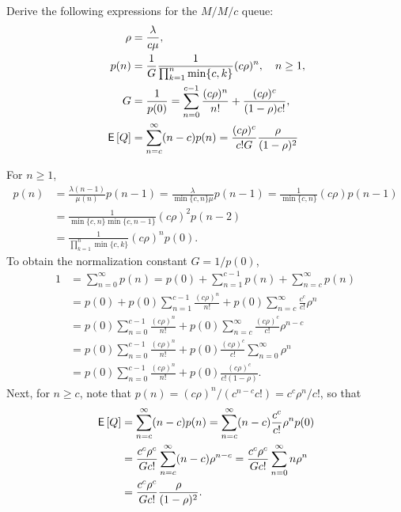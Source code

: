 \documentclass[stochastic-or.tex]{subfiles}
\begin{document}
\begin{extra}\label{ex:7}
Derive the following expressions for the  $M/M/c$ queue:
\begin{subequations}
\begin{align}
  \rho & = \frac{\lambda}{ c\mu},\\
p(n) &= \frac 1 {G} \frac{1}{\prod_{k=1}^{n}\min\{c, k\}}(c\rho)^{n} , \quad n\geq 1,\\
G &= \frac 1{p(0)} = \sum_{n=0}^{c-1} \frac{(c\rho)^n}{n!} + \frac{(c\rho)^c}{(1-\rho)c!}, \label{eq:501}\\
\,\mathsf{E}\left[Q\right] &= \sum_{n=c}^\infty (n-c) p(n) = \frac{(c\rho)^c}{c! G}\frac{\rho}{(1-\rho)^2}\\
\end{align}
\end{subequations}
\begin{solution}
  For $n\geq 1$,
 \begin{align*}
 p(n)
 &= \frac{\lambda(n-1)}{\mu(n)}p(n-1)
 = \frac{\lambda}{\min\{c, n\} \mu }p(n-1)
 = \frac{1}{\min\{c, n\}}(c\rho) p(n-1) \\
 & = \frac{1}{\min\{c, n\}\min\{c, n-1\}}(c\rho)^2 p(n-2) \\
 &= \frac{1}{\prod_{k=1}^{n}\min\{c, k\}}(c\rho)^{n} p(0).
 \end{align*}
To obtain the normalization constant $G = 1/p(0)$,
\begin{align*}
1 &= \sum_{n=0}^\infty p(n)
= p(0) + \sum_{n=1}^{c-1} p(n) + \sum_{n=c}^\infty p(n) \\
&=p(0) + p(0) \sum_{n=1}^{c-1}\frac{(c\rho)^n}{n!} +
 p(0)\sum_{n=c}^{\infty} \frac{c^c}{c!} \rho^{n} \\
&=p(0)\sum_{n=0}^{c-1}\frac{(c\rho)^n}{n!} +
 p(0) \sum_{n=c}^{\infty} \frac{(c\rho)^c}{c!} \rho^{n-c} \\
&=
p(0)\sum_{n=0}^{c-1}\frac{(c\rho)^n}{n!} +
p(0)\frac{(c\rho)^c}{c!} \sum_{n=0}^{\infty} \rho^n \\
&=
p(0) \sum_{n=0}^{c-1}\frac{(c\rho)^n}{n!} +
p(0)\frac{(c\rho)^c}{c!(1-\rho)}.
\end{align*}
Next, for $n\geq c$, note that $p(n) = (c \rho)^{n}/(c^{n-c}c!) = c^{c} \rho^{n}/c!$, so that
\begin{align*}
 \,\mathsf{E}\left[Q\right]
&=\sum_{n=c}^\infty (n-c) p(n)
=\sum_{n=c}^\infty (n-c) \frac{c^c}{c!}\rho^{n} p(0) \\
&=\frac{c^c\rho^c}{G c!} \sum_{n=c}^\infty (n-c) \rho^{n-c}
=\frac{c^c\rho^c}{G c!} \sum_{n=0}^\infty n \rho^n \\
&=\frac{c^c\rho^c}{G c!} \frac{\rho}{(1-\rho)^2}.
\end{align*}


\end{solution}
\end{extra}
\end{document}
